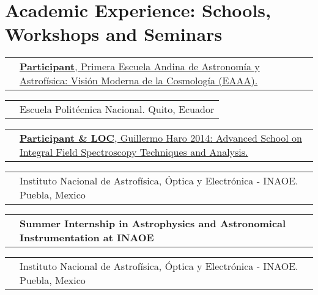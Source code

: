 \documentclass[11pt,letterpaper,sans]{moderncv}        %
\makeatletter
\renewcommand*{\cvitem}[3][.25em]{%
  \begin{tabular}{@{}p{\hintscolumnwidth}@{\hspace{\separatorcolumnwidth}}p{\maincolumnwidth}@{}}%
      \raggedleft\hintstyle{#2} &{#3}%
  \end{tabular}%
  \par\addvspace{#1}}
\makeatother
\begin{document}
\section{Academic Experience: Schools, Workshops and Seminars}
\cvitem{Dec 8-12, 2014}{\href{http://departamentodefisicaeventos.epn.edu.ec/}{\textbf{Participant}, Primera Escuela Andina de Astronom\'{i}a y Astrof\'{i}sica: Visi\'on Moderna de la Cosmolog\'{i}a (EAAA).}}
\cvitem{}{Escuela Polit\'ecnica Nacional. Quito, Ecuador}
\cvitem{Aug 25-Sep 5, 2014}{\href{http://xilonen.inaoep.mx/~progharo/gh2014School/}{\textbf{Participant \& LOC}, Guillermo Haro 2014: Advanced School on Integral Field Spectroscopy Techniques and Analysis.}}
\cvitem{}{Instituto Nacional de Astrof\'{i}sica, \'{O}ptica y Electr\'onica - INAOE. Puebla, Mexico}
\cvitem{Jun 17-Aug 23, 2014}{\textbf{Summer Internship in Astrophysics and Astronomical Instrumentation at INAOE}}
\cvitem{}{Instituto Nacional de Astrof\'{i}sica, \'{O}ptica y Electr\'onica - INAOE. Puebla, Mexico}
\end{document}
